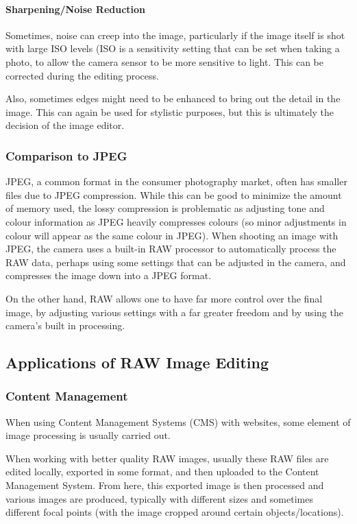 \documentclass[10pt,a4paper]{article}
\begin{document}
\paragraph{Sharpening/Noise Reduction}
Sometimes, noise can creep into the image, particularly if the image itself is shot with large ISO levels (ISO is a sensitivity setting that can be
set when taking a photo, to allow the camera sensor to be more sensitive to light. This can be corrected
during the editing process. 

Also, sometimes edges might need to be enhanced to bring out the detail in the image. This can again be used for stylistic purposes, but this is ultimately the
decision of the image editor. 
 
\subsubsection{Comparison to JPEG}
JPEG, a common format in the consumer photography market, often has smaller files due to JPEG compression.
While this can be good to minimize the amount of memory used, the lossy compression is problematic as adjusting tone
and colour information as JPEG heavily compresses colours (so minor adjustments in colour will appear as the same colour in JPEG).
When shooting an image with JPEG, the camera uses a built-in RAW processor to automatically process the RAW data, perhaps using some settings
that can be adjusted in the camera, and compresses the image down into a JPEG format.

On the other hand, RAW allows one to have far more control over the final image, by adjusting various settings with a far greater freedom and by using the camera's
built in processing.

\cite{UnderstandingRAWCapture}

\subsection{Applications of RAW Image Editing}
\subsubsection{Content Management}
When using Content Management Systems (CMS) with websites, some element of image processing is usually carried out.

When working with better quality RAW images, usually these RAW files are edited locally, exported in some format, and then
uploaded to the Content Management System. From here, this exported image is then processed and various images are produced,
typically with different sizes and sometimes different focal points (with the image cropped around certain objects/locations).
\end{document}
